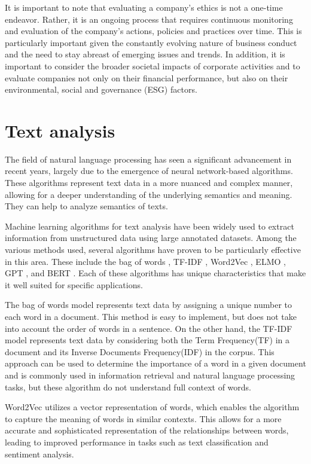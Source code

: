 \documentclass[PI]{ProjectProposal}
\begin{document}
It is important to note that evaluating a company's ethics is not a one-time endeavor. Rather, it is an ongoing process that requires continuous monitoring and evaluation of the company's actions, policies and practices over time. This is particularly important given the constantly evolving nature of business conduct and the need to stay abreast of emerging issues and trends. In addition, it is important to consider the broader societal impacts of corporate activities and to evaluate companies not only on their financial performance, but also on their environmental, social and governance (ESG) factors.
\section{Text analysis}
\label{sec:org86f5c87}
The field of natural language processing has seen a significant advancement in recent years, largely due to the emergence of neural network-based algorithms. These algorithms represent text data in a more nuanced and complex manner, allowing for a deeper understanding of the underlying semantics and meaning. They can help to analyze semantics of texts.

Machine learning algorithms for text analysis have been widely used to extract information from unstructured data using large annotated datasets. Among the various methods used, several algorithms have proven to be particularly effective in this area. These include the bag of words \autocite{doi:10.1080/00437956.1954.11659520}, TF-IDF \autocite{jones1972statistical}, Word2Vec\autocite{mikolov2013distributed} , ELMO \autocite{elmo}, GPT \autocite{radford2019language}, and BERT \autocite{devlin2018bert}. Each of these algorithms has unique characteristics that make it well suited for specific applications.

The bag of words model represents text data by assigning a unique number to each word in a document. This method is easy to implement, but does not take into account the order of words in a sentence. On the other hand, the TF-IDF model represents text data by considering both the Term Frequency(TF) in a document and its Inverse Documents Frequency(IDF) in the corpus. This approach can be used to determine the importance of a word in a given document and is commonly used in information retrieval and natural language processing tasks, but these algorithm do not understand full context of words.

Word2Vec utilizes a vector representation of words, which enables the algorithm to capture the meaning of words in similar contexts. This allows for a more accurate and sophisticated representation of the relationships between words, leading to improved performance in tasks such as text classification and sentiment analysis.
\end{document}
